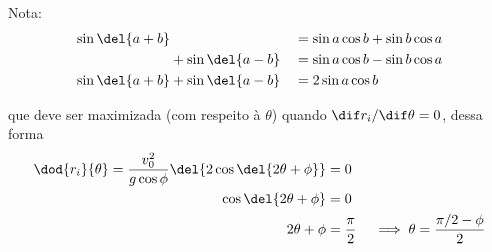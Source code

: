 \documentclass[]{IMTexam}
\begin{document}
\begin{questions}
\begin{solution}
\begin{multi}[2][t]
			\nextcol

			Nota:
			\begin{align}
				\sin\del{a+b} &                &  & =\sin a\cos b+\sin b\cos a\nonumber \\
				              & +\sin\del{a-b} &  & =\sin a\cos b-\sin b\cos a\nonumber \\
				\sin\del{a+b} & +\sin\del{a-b} &  & =2\sin a\cos b\label{eq:stp}
			\end{align}
		\end{multi}

		\smallskip
		que deve ser maximizada (com respeito à $ \theta $) quando $ \dif r_i/\dif\theta=0 $, dessa forma
		\begin{align*}
			\dod{r_i}{\theta}=\dfrac{v_0^{2}}{g\cos\phi}\del{2\cos\del{2\theta+\phi}} & =0                                                       \\
			\cos\del{2\theta+\phi}                                                    & =0                                                       \\
			2\theta+\phi                                                              & =\dfrac{\pi}{2}\quad\implies\theta=\dfrac{\pi/2-\phi}{2}
		\end{align*}


\end{solution}
\end{questions}
\end{document}
